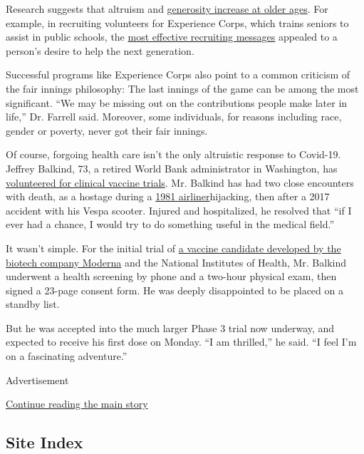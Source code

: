 Research suggests that altruism and
\href{https://academic.oup.com/psychsocgerontology/article/74/1/52/3105859}{generosity
increase at older ages}. For example, in recruiting volunteers for
Experience Corps, which trains seniors to assist in public schools, the
\href{https://ajph.aphapublications.org/doi/full/10.2105/AJPH.2009.169151}{most
effective recruiting messages} appealed to a person's desire to help the
next generation.

Successful programs like Experience Corps also point to a common
criticism of the fair innings philosophy: The last innings of the game
can be among the most significant. ``We may be missing out on the
contributions people make later in life,'' Dr. Farrell said. Moreover,
some individuals, for reasons including race, gender or poverty, never
got their fair innings.

Of course, forgoing health care isn't the only altruistic response to
Covid-19. Jeffrey Balkind, 73, a retired World Bank administrator in
Washington, has
\href{https://www.coronaviruspreventionnetwork.org/}{volunteered for
clinical vaccine trials}. Mr. Balkind has had two close encounters with
death, as a hostage during a
\href{https://www.washingtonpost.com/archive/lifestyle/1994/09/23/amateur-chronicles-crisis/0a961fb6-af41-4857-8884-5bfc0a3511fd/}{1981
airliner}hijacking, then after a 2017 accident with his Vespa scooter.
Injured and hospitalized, he resolved that ``if I ever had a chance, I
would try to do something useful in the medical field.''

It wasn't simple. For the initial trial of
\href{https://www.nytimes.com/2020/07/27/health/moderna-vaccine-covid.html}{a
vaccine candidate developed by the biotech company Moderna} and the
National Institutes of Health, Mr. Balkind underwent a health screening
by phone and a two-hour physical exam, then signed a 23-page consent
form. He was deeply disappointed to be placed on a standby list.

But he was accepted into the much larger Phase 3 trial now underway, and
expected to receive his first dose on Monday. ``I am thrilled,'' he
said. ``I feel I'm on a fascinating adventure.''

Advertisement

\protect\hyperlink{after-bottom}{Continue reading the main story}

\hypertarget{site-index}{%
\subsection{Site Index}\label{site-index}}

